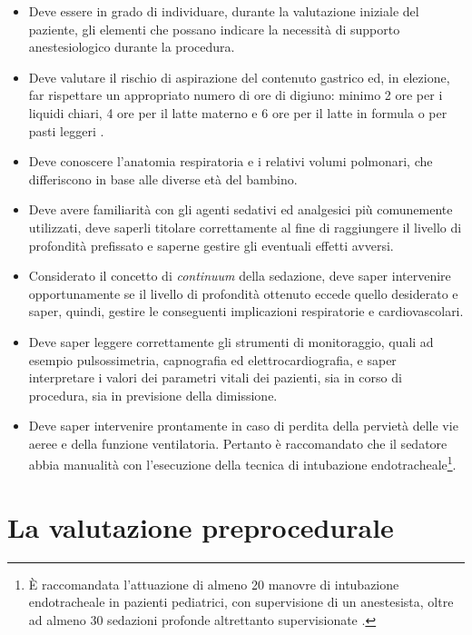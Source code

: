 \begin{itemize}
    \item Deve essere in grado di individuare, durante la valutazione iniziale del paziente, gli elementi che possano indicare la necessità di supporto anestesiologico durante la procedura.
    \item Deve valutare il rischio di aspirazione del contenuto gastrico ed, in elezione, far rispettare un appropriato numero di ore di digiuno: minimo 2 ore per i liquidi chiari, 4 ore per il latte materno e 6 ore per il latte in formula o per pasti leggeri \cite{Guidelines2019}. 
    \item Deve conoscere l'anatomia respiratoria e i relativi volumi polmonari, che differiscono in base alle diverse età del bambino. 
    \item Deve avere familiarità con gli agenti sedativi ed analgesici più comunemente utilizzati, deve saperli titolare correttamente al fine di raggiungere il livello di profondità prefissato e saperne gestire gli eventuali effetti avversi. 
    \item Considerato il concetto di \emph{continuum} della sedazione, deve saper intervenire opportunamente se il livello di profondità ottenuto eccede quello desiderato e saper, quindi, gestire le conseguenti implicazioni respiratorie e cardiovascolari. 
    \item Deve saper leggere correttamente gli strumenti di monitoraggio, quali ad esempio pulsossimetria, capnografia ed elettrocardiografia, e saper interpretare i valori dei parametri vitali dei pazienti, sia in corso di procedura, sia in previsione della dimissione. 
    \item Deve saper intervenire prontamente in caso di perdita della pervietà delle vie aeree e della funzione ventilatoria. Pertanto è raccomandato che il sedatore abbia manualità con l'esecuzione della tecnica di intubazione endotracheale\footnote{\`E raccomandata l'attuazione di almeno 20 manovre di intubazione endotracheale in pazienti pediatrici, con supervisione di un anestesista, oltre ad almeno 30 sedazioni profonde altrettanto supervisionate \cite{Simeupsedazione}.}.
\end{itemize}

\section{La valutazione preprocedurale}

